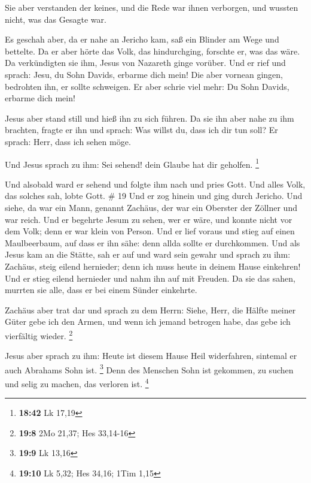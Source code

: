  Sie aber verstanden der keines, und die Rede war ihnen
verborgen, und wussten nicht, was das Gesagte war.

 Es geschah aber, da er nahe an Jericho kam, saß ein
Blinder am Wege und bettelte.  Da er aber hörte das Volk,
das hindurchging, forschte er, was das wäre.  Da
verkündigten sie ihm, Jesus von Nazareth ginge vorüber. 
Und er rief und sprach: Jesu, du Sohn Davids, erbarme dich mein!
 Die aber vornean gingen, bedrohten ihn, er sollte
schweigen. Er aber schrie viel mehr: Du Sohn Davids, erbarme dich mein!

 Jesus aber stand still und hieß ihn zu sich führen. Da
sie ihn aber nahe zu ihm brachten, fragte er ihn  und
sprach: Was willst du, dass ich dir tun soll? Er sprach: Herr, dass ich
sehen möge.

 Und Jesus sprach zu ihm: Sei sehend! dein Glaube hat dir
geholfen. \footnote{\textbf{18:42} Lk 17,19}

 Und alsobald ward er sehend und folgte ihm nach und
pries Gott. Und alles Volk, das solches sah, lobte Gott. \# 19
 Und er zog hinein und ging durch Jericho. 
Und siehe, da war ein Mann, genannt Zachäus, der war ein Oberster der
Zöllner und war reich.  Und er begehrte Jesum zu sehen,
wer er wäre, und konnte nicht vor dem Volk; denn er war klein von
Person.  Und er lief voraus und stieg auf einen
Maulbeerbaum, auf dass er ihn sähe: denn allda sollte er durchkommen.
 Und als Jesus kam an die Stätte, sah er auf und ward sein
gewahr und sprach zu ihm: Zachäus, steig eilend hernieder; denn ich muss
heute in deinem Hause einkehren!  Und er stieg eilend
hernieder und nahm ihn auf mit Freuden.  Da sie das sahen,
murrten sie alle, dass er bei einem Sünder einkehrte.

 Zachäus aber trat dar und sprach zu dem Herrn: Siehe,
Herr, die Hälfte meiner Güter gebe ich den Armen, und wenn ich jemand
betrogen habe, das gebe ich vierfältig wieder. \footnote{\textbf{19:8}
  2Mo 21,37; Hes 33,14-16}

 Jesus aber sprach zu ihm: Heute ist diesem Hause Heil
widerfahren, sintemal er auch Abrahams Sohn ist. \footnote{\textbf{19:9}
  Lk 13,16}  Denn des Menschen Sohn ist gekommen, zu
suchen und selig zu machen, das verloren ist. \footnote{\textbf{19:10}
  Lk 5,32; Hes 34,16; 1Tim 1,15}


